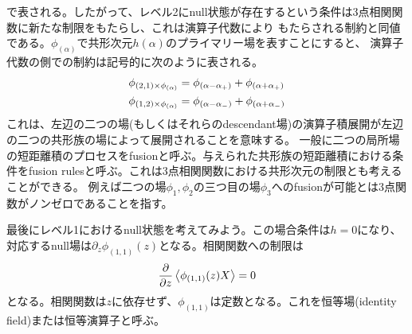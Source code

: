 \documentclass[11pt, aps, longbibliography]{article}
\numberwithin{equation}{section}
\begin{document}
        で表される。したがって、レベル2にnull状態が存在するという条件は3点相関関数に新たな制限をもたらし、これは演算子代数により
        もたらされる制約と同値である。$\phi_{(\alpha)}$で共形次元$h(\alpha)$のプライマリー場を表すことにすると、
        演算子代数の側での制約は記号的に次のように表される。
        \begin{align}\label{eq:minimal1-8}
            \phi_{(2,1) \times \phi_{(\alpha)}} &= \phi_{(\alpha-\alpha_+)} + \phi_{(\alpha+\alpha_+)} \\
            \phi_{(1,2) \times \phi_{(\alpha)}} &= \phi_{(\alpha-\alpha_-)} + \phi_{(\alpha+\alpha_-)} \notag 
        \end{align}
        これは、左辺の二つの場(もしくはそれらのdescendant場)の演算子積展開が左辺の二つの共形族の場によって展開されることを意味する。
        一般に二つの局所場の短距離積のプロセスをfusionと呼ぶ。与えられた共形族の短距離積における条件をfusion rulesと呼ぶ。これは3点相関関数における共形次元の制限とも考えることができる。
        例えば二つの場$\phi_1,\phi_2$の三つ目の場$\phi_3$へのfusionが可能とは3点関数がノンゼロであることを指す。

        最後にレベル1におけるnull状態を考えてみよう。この場合条件は$h=0$になり、対応するnull場は$\partial_z \phi_{(1,1)}(z)$となる。相関関数への制限は
        \begin{equation}\label{eq:minimal1-9}
            \frac{\partial}{\partial z}\expval{\phi_{(1,1)}(z)X} = 0
        \end{equation}
        となる。相関関数は$z$に依存せず、$\phi_{(1,1)}$は定数となる。これを恒等場(identity field)または恒等演算子と呼ぶ。
\end{document}
